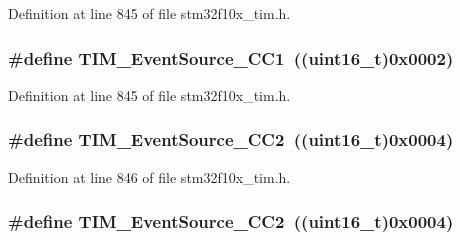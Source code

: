 Definition at line 845 of file stm32f10x\+\_\+tim.\+h.

\subsubsection[{\texorpdfstring{T\+I\+M\+\_\+\+Event\+Source\+\_\+\+C\+C1}{TIM_EventSource_CC1}}]{\setlength{\rightskip}{0pt plus 5cm}\#define T\+I\+M\+\_\+\+Event\+Source\+\_\+\+C\+C1~(({\bf uint16\+\_\+t})0x0002)}\hypertarget{group___t_i_m___event___source_gaa634c46d4ac521ad16e25be97b487e8a}{}\label{group___t_i_m___event___source_gaa634c46d4ac521ad16e25be97b487e8a}


Definition at line 845 of file stm32f10x\+\_\+tim.\+h.

\subsubsection[{\texorpdfstring{T\+I\+M\+\_\+\+Event\+Source\+\_\+\+C\+C2}{TIM_EventSource_CC2}}]{\setlength{\rightskip}{0pt plus 5cm}\#define T\+I\+M\+\_\+\+Event\+Source\+\_\+\+C\+C2~(({\bf uint16\+\_\+t})0x0004)}\hypertarget{group___t_i_m___event___source_ga5e2082a09552acc9c7e9577f104ba15a}{}\label{group___t_i_m___event___source_ga5e2082a09552acc9c7e9577f104ba15a}


Definition at line 846 of file stm32f10x\+\_\+tim.\+h.

\subsubsection[{\texorpdfstring{T\+I\+M\+\_\+\+Event\+Source\+\_\+\+C\+C2}{TIM_EventSource_CC2}}]{\setlength{\rightskip}{0pt plus 5cm}\#define T\+I\+M\+\_\+\+Event\+Source\+\_\+\+C\+C2~(({\bf uint16\+\_\+t})0x0004)}\hypertarget{group___t_i_m___event___source_ga5e2082a09552acc9c7e9577f104ba15a}{}\label{group___t_i_m___event___source_ga5e2082a09552acc9c7e9577f104ba15a}


